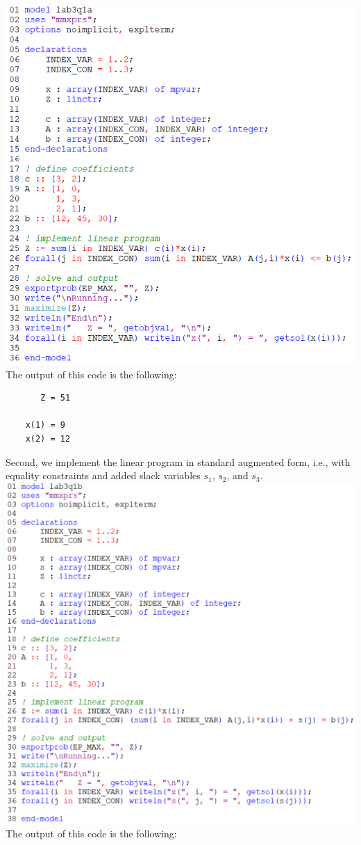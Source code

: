 \documentclass[12pt]{article}
\theoremstyle{definition}
\begin{document}
\includegraphics[scale=0.7]{code1a.png}\\
The output of this code is the following:

\lstset{basicstyle=\ttfamily}
\begin{lstlisting}
       Z = 51
    
    x(1) = 9
    x(2) = 12
\end{lstlisting}

\newpage

Second, we implement the linear program in standard augmented form, i.e., with equality constraints and added slack variables $s_1$, $s_2$, and $s_3$.\\

\includegraphics[scale=0.7]{code1b.png}\\
The output of this code is the following:
\end{document}
